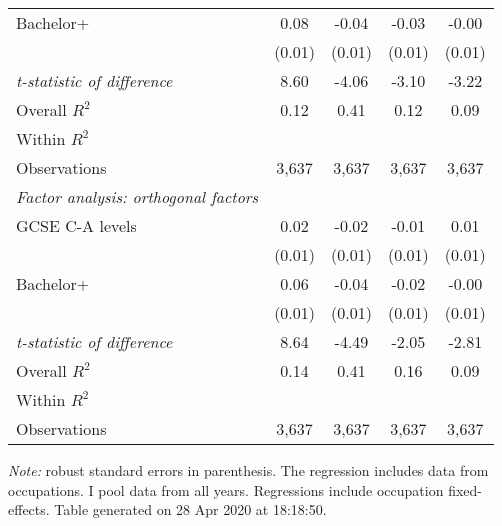 \begin{center}
\begin{threeparttable}[!h]
\begin{tabular}{lcccc}
\hspace{3mm}Bachelor+&        0.08\sym{***}&       -0.04\sym{***}&       -0.03\sym{***}&       -0.00         \\
                    &      (0.01)         &      (0.01)         &      (0.01)         &      (0.01)         \\
\textit{t-statistic of difference}&        8.60         &       -4.06         &       -3.10         &       -3.22         \\
\midrule Overall $ R^2$&        0.12         &        0.41         &        0.12         &        0.09         \\
Within $ R^2$       &                     &                     &                     &                     \\
Observations        &       3,637         &       3,637         &       3,637         &       3,637         \\
\midrule \vspace{1mm}\textit{Factor analysis: orthogonal factors} \\ 
\hspace{3mm}GCSE C-A levels&        0.02\sym{***}&       -0.02\sym{***}&       -0.01         &        0.01         \\
                    &      (0.01)         &      (0.01)         &      (0.01)         &      (0.01)         \\
\hspace{3mm}Bachelor+&        0.06\sym{***}&       -0.04\sym{***}&       -0.02\sym{*}  &       -0.00         \\
                    &      (0.01)         &      (0.01)         &      (0.01)         &      (0.01)         \\
\textit{t-statistic of difference}&        8.64         &       -4.49         &       -2.05         &       -2.81         \\
\midrule Overall $ R^2$&        0.14         &        0.41         &        0.16         &        0.09         \\
Within $ R^2$       &                     &                     &                     &                     \\
Observations        &       3,637         &       3,637         &       3,637         &       3,637         \\
\bottomrule
\bottomrule
\end{tabular}
\begin{tablenotes}
\item \footnotesize \textit{Note:} robust standard errors in parenthesis. The regression includes data from occupations. I pool data from all years. Regressions include occupation fixed-effects. Table generated on 28 Apr 2020 at 18:18:50.
\end{tablenotes}
\end{threeparttable}
\end{center}
